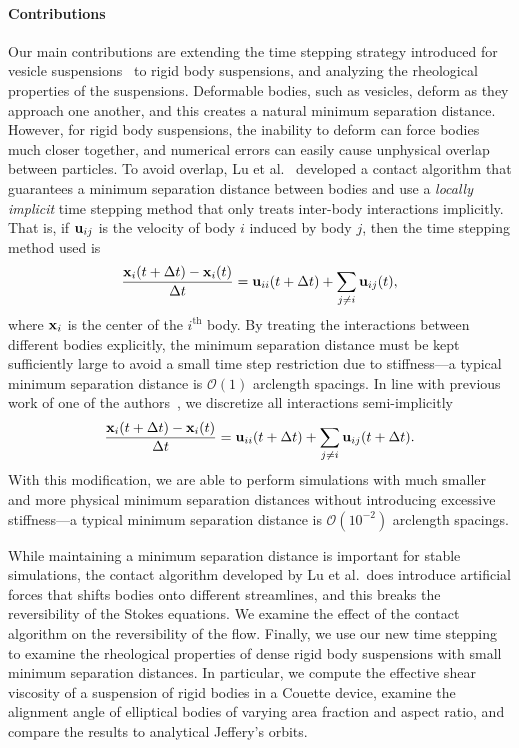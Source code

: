 \documentclass[preprint, 10pt]{elsarticle}
\begin{document}
\paragraph{Contributions} Our main contributions are extending the time
stepping strategy introduced for vesicle suspensions~\cite{Quaife2014}
to rigid body suspensions, and analyzing the rheological properties of
the suspensions.  Deformable bodies, such as vesicles, deform as they
approach one another, and this creates a natural minimum separation
distance.  However, for rigid body suspensions, the inability to deform
can force bodies much closer together, and numerical errors can easily
cause unphysical overlap between particles.  To avoid overlap, Lu et
al.~\cite{Lu2017} developed a contact algorithm that guarantees a
minimum separation distance between bodies and use a {\em locally
implicit} time stepping method that only treats inter-body interactions
implicitly.  That is, if ${\mathbf{u}}_{ij}$ is the velocity of body $i$ induced
by body $j$, then the time stepping method used is
\begin{align*}
  \frac{{\mathbf{x}}_i(t + \Delta t) -  {\mathbf{x}}_i(t)}{\Delta t} = 
    {\mathbf{u}}_{ii}(t+\Delta t) + \sum_{j \neq i} {\mathbf{u}}_{ij}(t),
\end{align*}
where ${\mathbf{x}}_i$ is the center of the $i^{\mathrm{th}}$ body.  By treating
the interactions between different bodies explicitly, the minimum
separation distance must be kept sufficiently large to avoid a small
time step restriction due to stiffness---a typical minimum separation
distance is $\mathcal{O}(1)$ arclength spacings.  In line with previous
work of one of the authors~\cite{Quaife2014}, we discretize all
interactions semi-implicitly
\begin{align*}
  \frac{{\mathbf{x}}_i(t + \Delta t) -  {\mathbf{x}}_i(t)}{\Delta t} = 
    {\mathbf{u}}_{ii}(t+\Delta t) + \sum_{j \neq i} {\mathbf{u}}_{ij}(t+\Delta t).
\end{align*}
With this modification, we are able to perform simulations with much
smaller and more physical minimum separation distances without
introducing excessive stiffness---a typical minimum separation distance
is $\mathcal{O}(10^{-2})$ arclength spacings.

While maintaining a minimum separation distance is important for stable
simulations, the contact algorithm developed by Lu et al.~does introduce
artificial forces that shifts bodies onto different streamlines, and
this breaks  the reversibility of the Stokes equations.  We examine the
effect of the contact algorithm on the reversibility of the flow.
Finally, we use our new time stepping to examine the rheological
properties of dense rigid body suspensions with small minimum separation
distances.  In particular, we compute the effective shear viscosity of a
suspension of rigid bodies in a Couette device, examine the alignment
angle of elliptical bodies of varying area fraction and aspect ratio,
and compare the results to analytical Jeffery's orbits.
\end{document}
